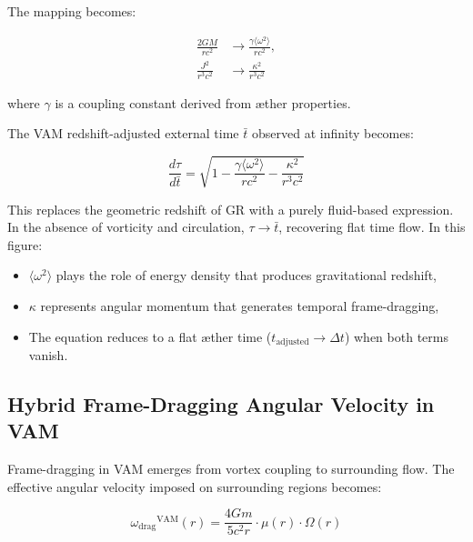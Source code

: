 The mapping becomes:

\begin{equation}
    \begin{aligned}
        \frac{2GM}{rc^2} &\rightarrow \frac{\gamma \langle \omega^2 \rangle}{r c^2}, \\
        \frac{J^2}{r^3 c^2} &\rightarrow \frac{\kappa^2}{r^3 c^2}
    \end{aligned}
    \label{eq:Kerr_replacements}
\end{equation}

\noindent where \( \gamma \) is a coupling constant derived from æther properties.

The VAM redshift-adjusted external time \( \bar{t} \) observed at infinity becomes:

\begin{equation}
    \boxed{
        \frac{d\tau}{d\bar{t}} = \sqrt{1 - \frac{\gamma \langle \omega^2 \rangle}{r c^2} - \frac{\kappa^2}{r^3 c^2}}
    }
    \label{eq:Kerr_time_dilation_ae}
\end{equation}

This replaces the geometric redshift of GR with a purely fluid-based expression. In the absence of vorticity and circulation, \( \tau \to \bar{t} \), recovering flat time flow. In this figure:
\begin{itemize}
    \item $\langle \omega^2 \rangle$ plays the role of energy density that produces gravitational redshift,
    \item $\kappa$ represents angular momentum that generates temporal frame-dragging,
    \item The equation reduces to a flat æther time ($t_\text{adjusted} \to \Delta t$) when both terms vanish.

\end{itemize}

\subsection*{Hybrid Frame-Dragging Angular Velocity in VAM}

Frame-dragging in VAM emerges from vortex coupling to surrounding flow. The effective angular velocity imposed on surrounding regions becomes:

\begin{equation}
    {\omega_{\text{drag}}}^{\text{VAM}}(r) =
    \frac{4 G m}{5 c^2 r} \cdot \mu(r) \cdot \Omega(r)
\end{equation}

